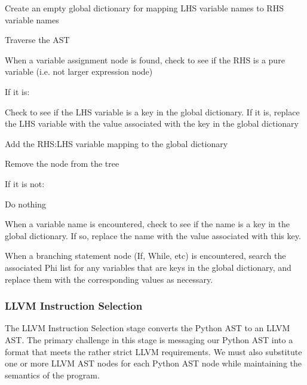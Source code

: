 \documentclass[11pt,twocolumn]{article}
\newenvironment{packed_enum}{
\begin{enumerate}
  \setlength{\itemsep}{1pt}
  \setlength{\parskip}{0pt}
  \setlength{\parsep}{0pt}
}{\end{enumerate}}
\begin{document}
\begin{packed_enum}
\item Create an empty global dictionary for mapping LHS variable names
  to RHS variable names
\item Traverse the AST
\item When a variable assignment node is found, check to see if the
  RHS is a pure variable (i.e. not larger expression node)
  \begin{packed_enum}
  \item If it is:
    \begin{packed_enum}
    \item Check to see if the LHS variable is a key in the
      global dictionary. If it is, replace the LHS variable with the
      value associated with the key in the global dictionary
    \item Add the RHS:LHS variable mapping to the global dictionary
    \item Remove the node from the tree
    \end{packed_enum}
  \item If it is not:
    \begin{packed_enum}
      \item Do nothing
    \end{packed_enum}
  \end{packed_enum}
\item When a variable name is encountered, check to see if the name is
  a key in the global dictionary. If so, replace the name with the
  value associated with this key.
\item When a branching statement node (If, While, etc) is encountered,
  search the associated Phi list for any variables that are keys in
  the global dictionary, and replace them with the corresponding
  values as necessary.
\end{packed_enum}

\subsubsection{LLVM Instruction Selection}
\label{sec:stage-LLVMInstructionSelection}

The LLVM Instruction Selection stage converts the Python AST to an LLVM
AST. The primary challenge in this stage is messaging our Python AST
into a format that meets the rather strict LLVM requirements. We must
also substitute one or more LLVM AST nodes for each Python AST node
while maintaining the semantics of the program.
\end{document}
